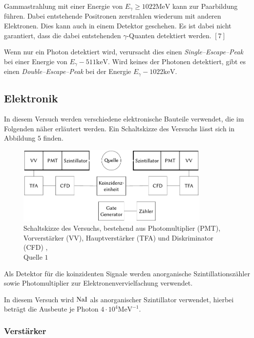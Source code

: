 \documentclass[12pt,a4paper]{scrartcl}
\numberwithin{equation}{section} %
\newcommand{\pu}[1]{\ensuremath{\mathrm{#1}}}
\renewcommand{\[}{} %
\renewcommand{\]}{\noindent} %
\begin{document}
Gammastrahlung mit einer Energie von $E_\gamma\ge\pu{1022MeV}$ kann zur Paarbildung führen. Dabei entstehende Positronen zerstrahlen wiederum mit anderen Elektronen. Dies kann auch in einem Detektor geschehen. Es ist dabei nicht garantiert, dass die dabei entstehenden $\gamma$-Quanten detektiert werden. $[7]$

Wenn nur ein Photon detektiert wird, verursacht dies einen
\emph{Single--Escape--Peak} bei einer Energie von
\(E_\gamma - \pu{511 keV}\). Wird keines der Photonen detektiert, gibt
es einen \emph{Double--Escape--Peak} bei der Energie
\(E_\gamma - \pu{1022 keV}\).

\hypertarget{elektronik}{%
\subsection{Elektronik}\label{elektronik}}

In diesem Versuch werden verschiedene elektronische Bauteile verwendet,
die im Folgenden näher erläutert werden. Ein Schaltskizze des Versuchs
lässt sich in Abbildung \(5\) finden.

\begin{figure}
	\centering
	\includegraphics[width=0.85\textwidth]{../media/B3.4/Schaltplan.pdf}
	\caption{Schaltskizze des Versuchs, bestehend aus
		Photomultiplier (PMT), Vorverstärker (VV),
		Hauptverstärker (TFA) und Diskriminator (CFD) ,\\
		Quelle \(1\)}
	\label{abb:Schaltplan}
\end{figure}

Als Detektor für die koinzidenten Signale werden anorganische
Szintillationszähler sowie Photomultiplier zur Elektronenvervielfachung
verwendet.

In diesem Versuch wird \(\ce{NaI}\) als anorganischer Szintillator
verwendet, hierbei beträgt die Ausbeute je Photon
\(\pu{4\cdot 10^{4} MeV^{-1}}\).

\hypertarget{verstuxe4rker}{%
\subsubsection{Verstärker}\label{verstuxe4rker}}
\end{document}
